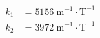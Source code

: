 \begin{align*}
k_1 &= 5156~\text{m}^{-1}\cdot \text{T}^{-1} \\
k_2 &= 3972~\text{m}^{-1}\cdot \text{T}^{-1} 
\end{align*}
